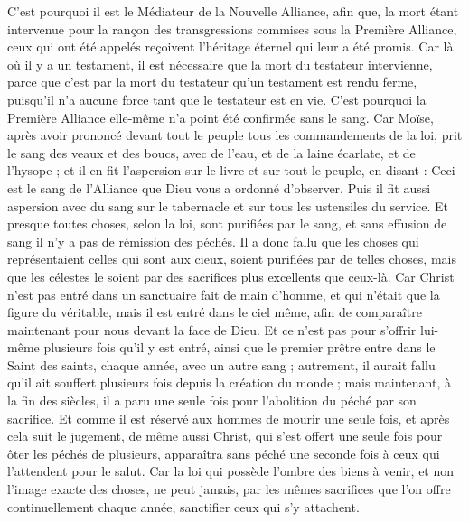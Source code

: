 \begin{multicols}{2}
C'est pourquoi il est le Médiateur de la Nouvelle Alliance, afin que, la mort étant intervenue pour la rançon des transgressions commises sous la Première Alliance, ceux qui ont été appelés reçoivent l'héritage éternel qui leur a été promis.
Car là où il y a un testament, il est nécessaire que la mort du testateur intervienne,
parce que c'est par la mort du testateur qu'un testament est rendu ferme, puisqu'il n'a aucune force tant que le testateur est en vie.
C'est pourquoi la Première Alliance elle-même n'a point été confirmée sans le sang.
Car Moïse, après avoir prononcé devant tout le peuple tous les commandements de la loi, prit le sang des veaux et des boucs, avec de l'eau, et de la laine écarlate, et de l'hysope ; et il en fit l'aspersion sur le livre et sur tout le peuple, en disant :
Ceci est le sang de l'Alliance que Dieu vous a ordonné d'observer.
Puis il fit aussi aspersion avec du sang sur le tabernacle et sur tous les ustensiles du service.
Et presque toutes choses, selon la loi, sont purifiées par le sang, et sans effusion de sang il n'y a pas de rémission des péchés.
Il a donc fallu que les choses qui représentaient celles qui sont aux cieux, soient purifiées par de telles choses, mais que les célestes le soient par des sacrifices plus excellents que ceux-là.
Car Christ n'est pas entré dans un sanctuaire fait de main d'homme, et qui n'était que la figure du véritable, mais il est entré dans le ciel même, afin de comparaître maintenant pour nous devant la face de Dieu.
Et ce n'est pas pour s'offrir lui-même plusieurs fois qu'il y est entré, ainsi que le premier prêtre entre dans le Saint des saints, chaque année, avec un autre sang ;
autrement, il aurait fallu qu'il ait souffert plusieurs fois depuis la création du monde ; mais maintenant, à la fin des siècles, il a paru une seule fois pour l'abolition du péché par son sacrifice.
Et comme il est réservé aux hommes de mourir une seule fois, et après cela suit le jugement,
de même aussi Christ, qui s'est offert une seule fois pour ôter les péchés de plusieurs, apparaîtra sans péché une seconde fois à ceux qui l'attendent pour le salut.
\VerseOne{}Car la loi qui possède l'ombre des biens à venir, et non l'image exacte des choses, ne peut jamais, par les mêmes sacrifices que l'on offre continuellement chaque année, sanctifier ceux qui s'y attachent.

\end{multicols}
